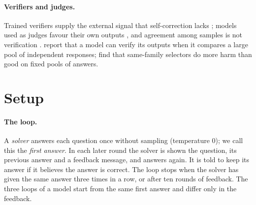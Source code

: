 \documentclass[11pt]{article}
\begin{document}
\paragraph{Verifiers and judges.}
Trained verifiers supply the external signal that self-correction lacks \citep{lightman2024verify}; models used as judges favour their own outputs \citep{zheng2023judging,panickssery2024evaluators}, and agreement among samples is not verification \citep{denisov2026consensus}.
\citet{zhao2025sample} report that a model can verify its outputs when it compares a large pool of independent responses; \citet{hu2026oracle} find that same-family selectors do more harm than good on fixed pools of answers.

\section{Setup}
\label{sec:setup}

\paragraph{The loop.}
A \emph{solver} answers each question once without sampling (temperature 0); we call this the \emph{first answer}.
In each later round the solver is shown the question, its previous answer and a feedback message, and answers again.
It is told to keep its answer if it believes the answer is correct.
The loop stops when the solver has given the same answer three times in a row, or after ten rounds of feedback.
The three loops of a model start from the same first answer and differ only in the feedback.
\end{document}
